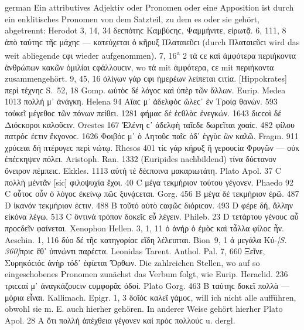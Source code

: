 \begin{otherlanguage*}{german}
Ein attributives Adjektiv oder Pronomen oder eine Apposition ist durch ein enklitisches Pronomen von dem Satzteil, zu dem es oder sie gehört, abgetrennt: Herodot 3, 14, 34 δεϲπότηϲ  Καμβύϲηϲ, Ψαμμήνιτε, εἰρωτᾷ. 6, 111, 8 ἀπὸ ταύτηϲ  τῆϲ μάχηϲ — κατεύχεται ὁ κῆρυξ Πλαταιεῦϲι (durch Πλαταιεῦϲι wird das weit abliegende ϲφι wieder aufgenommen). 7, 16\textsuperscript{a} 2 τά ϲε καὶ ἀμφότερα περιήκοντα ἀνθρώπων κακῶν ὁμιλίαι ϲφάλλουϲιν, wo τά mit ἀμφότερα, ϲε mit περιήκοντα zusammengehört. 9, 45, 16 ὀλίγων γάρ ϲφι ἡμερέων λείπεται ϲιτία. [Hippokrates] περὶ τέχνηϲ S.~52, 18 Gomp. ωὑτὸϲ δέ  λόγοϲ καὶ ὑπὲρ τῶν ἄλλων. Eurip. Medea 1013 πολλή μ᾽ ἀνάγκη. Helena 94 Αἴαϲ μ᾽ ἀδελφὸϲ ὤλεϲ᾽ ἐν Τροίᾳ θανών. 593 τοὐκεῖ  μέγεθοϲ τῶν πόνων πείθει. 1281 φήμαϲ δέ  ἐϲθλὰϲ ἐνεγκών. 1643 διϲϲοὶ δέ  Διόϲκοροι καλοῦϲιν. Orestes 167 Ἑλένη ϲ᾽ ἀδελφὴ ταῖϲδε δωρεῖται χοαίϲ. 482 φίλου  πατρόϲ ἐϲτιν ἔκγονοϲ. 1626 Φοιβόϲ μ᾽ ὁ Λητοῦϲ παῖϲ ὁδ᾽ ἐγγὺϲ ὢν καλῶ. Fragm. 911 χρύϲεαι δή  πτέρυγεϲ περὶ νώτῳ. Rhesos 401 τίϲ γάρ  κήρυξ ἢ γερουϲία Φρυγῶν — οὐκ ἐπέϲκηψεν πόλει. Aristoph. Ran. 1332 (Euripides nachbildend) τίνα  δύϲτανον ὄνειρον πέμπειϲ. Ekkles. 1113 αὐτή τέ  δέϲποινα μακαριωτάτη. Plato Apol. 37 C πολλὴ μέντἄν [sic]  φιλοψυχία ἔχοι. 40 C μέγα  τεκμήριον τούτου γέγονεν. Phaedo 92 C οὗτοϲ οὖν  ὁ λόγοϲ ἐκείνῳ πῶϲ ξυνᾴϲεται. Gorg. 456 Β μέγα δέ  τεκμήριον ἐρῶ. 487 D ἱκανόν  τεκμήριον ἐϲτιν. 488 Β τοῦτό  αὐτὸ ϲαφῶϲ διόριϲον. 493 D φέρε δή, ἄλλην  εἰκόνα λέγω. 513 C ὅντινά  τρόπον δοκεῖϲ εὖ λέγειν. Phileb. 23 D τετάρτου  γένουϲ αὖ προϲδεῖν φαίνεται. Xenophon Hellen. 3, 1, 11 ὁ ἀνήρ  ὁ ἐμὸϲ καὶ τἆλλα φίλοϲ ἦν. Aeschin. 1, 116 δύο δέ  τῆϲ κατηγορίαϲ εἴδη λέλειπται. Bion~9, 1 ἁ μεγάλα  Κύ-\hypertarget{p360}{\emph{[S. 360]}}\label{p360}πριϲ ἔθ᾽ ὑπνώντι παρέϲτα. Leonidas Tarent. Anthol. Pal. 7, 660 Ξεῖνε, Συρηκόϲιόϲ  ἀνὴρ τόδ᾽ ἐφίεται Ὄρθων. Die zahlreichen Stellen, wo auf so eingeschobenes Pronomen zunächst das Verbum folgt, wie Eurip. Heraclid. 236 τριϲϲαί μ᾽ ἀναγκάζουϲιν ϲυμφορᾶϲ ὁδοί. Plato Gorg. 463 B ταύτηϲ  δοκεῖ πολλὰ — μόρια εἶναι. Kallimach. Epigr. 1, 3 δοῖόϲ  καλεῖ γάμοϲ, will ich nicht alle aufführen, obwohl sie m. E. auch hierher gehören. In anderer Weise gehört hierher Plato Apol. 28 A ὅτι πολλή  ἀπέχθεια γέγονεν καὶ πρὸϲ πολλούϲ u. dergl.


\end{otherlanguage*}
